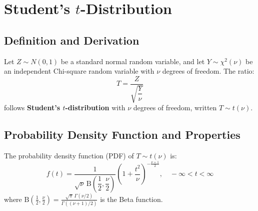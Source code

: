 \documentclass[12pt,a4paper]{article}
\begin{document}
\section{Student's \texorpdfstring{$t$}{t}-Distribution}

\subsection{Definition and Derivation}

\begin{tcolorbox}[defbox, title={\textbf{Mathematical Definition of Student's $t$-Variable}}]
Let $Z \sim N(0, 1)$ be a standard normal random variable, and let $Y \sim \chi^2(\nu)$ be an independent Chi-square random variable with $\nu$ degrees of freedom. The ratio:
\begin{equation}
  T = \frac{Z}{\sqrt{\dfrac{Y}{\nu}}}
\end{equation}
follows \textbf{Student's $t$-distribution} with $\nu$ degrees of freedom, written $T \sim t(\nu)$.
\end{tcolorbox}

\subsection{Probability Density Function and Properties}

The probability density function (PDF) of $T \sim t(\nu)$ is:
\begin{equation}
  f(t) = \frac{1}{\sqrt{\nu}\,\mathrm{B}\left(\dfrac{1}{2}, \dfrac{\nu}{2}\right)}\left(1 + \frac{t^2}{\nu}\right)^{-\frac{\nu+1}{2}}, \quad -\infty < t < \infty
\end{equation}
where $\mathrm{B}\left(\frac{1}{2}, \frac{\nu}{2}\right) = \frac{\sqrt{\pi}\,\Gamma(\nu/2)}{\Gamma((\nu+1)/2)}$ is the Beta function.
\end{document}
